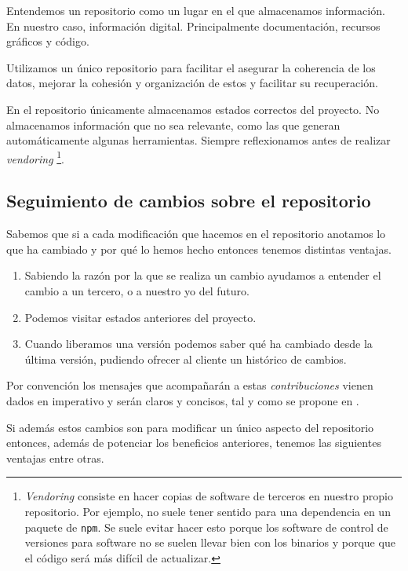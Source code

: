 Entendemos un repositorio como un lugar en el que almacenamos información.
En nuestro caso, información digital. Principalmente documentación, recursos
gráficos y código.

Utilizamos un único repositorio para facilitar el asegurar la coherencia
de los datos, mejorar la cohesión y organización de estos y facilitar su
recuperación.

En el repositorio únicamente almacenamos estados correctos del proyecto. No
almacenamos información que no sea relevante, como las que generan automáticamente
algunas herramientas. Siempre reflexionamos antes de realizar \textit{vendoring}%
\footnote{\textit{Vendoring} consiste en hacer copias de software de terceros en
nuestro propio repositorio. Por ejemplo, no suele tener sentido para una dependencia en
un paquete de \texttt{npm}. Se suele evitar hacer esto porque los software de control
de versiones para software no se suelen llevar bien con los binarios y porque que el código será
más difícil de actualizar.}.

\subsection{Seguimiento de cambios sobre el repositorio}

Sabemos que si a cada modificación que hacemos en el repositorio anotamos
lo que ha cambiado y por qué lo hemos hecho entonces tenemos distintas ventajas.

\begin{enumerate}
    \item Sabiendo la razón por la que se realiza un cambio ayudamos a entender
          el cambio a un tercero, o a nuestro yo del futuro.
    \item Podemos visitar estados anteriores del proyecto.
    \item Cuando liberamos una versión podemos saber qué ha cambiado desde la última
          versión, pudiendo ofrecer al cliente un histórico de cambios.
\end{enumerate}

Por convención los mensajes que acompañarán a estas \textit{contribuciones} vienen
dados en imperativo y serán claros y concisos, tal y como se propone en \cite[Commit Guidelines]{ProGIT}.

Si además estos cambios son para modificar un único aspecto del repositorio
entonces, además de potenciar los beneficios anteriores, tenemos las siguientes
ventajas entre otras.

